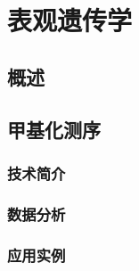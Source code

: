 \section{表观遗传学}
\subsection{概述}
\subsection{甲基化测序}
\subsubsection{技术简介}
\subsubsection{数据分析}
\subsubsection{应用实例}
